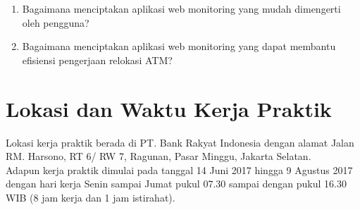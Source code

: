 \begin{enumerate}
	\item Bagaimana menciptakan aplikasi web monitoring yang mudah dimengerti oleh pengguna?
	\item Bagaimana menciptakan aplikasi web monitoring yang dapat membantu efisiensi pengerjaan relokasi ATM?
\end{enumerate}

\section{Lokasi dan Waktu Kerja Praktik}
\tab Lokasi kerja praktik berada di PT. Bank Rakyat Indonesia dengan alamat Jalan RM. Harsono, RT 6/ RW 7, Ragunan, Pasar Minggu, Jakarta Selatan.\\
\tab Adapun kerja praktik dimulai pada tanggal 14 Juni 2017 hingga 9 Agustus 2017 dengan hari kerja Senin sampai Jumat pukul 07.30 sampai dengan pukul 16.30 WIB (8 jam kerja dan 1 jam istirahat).

